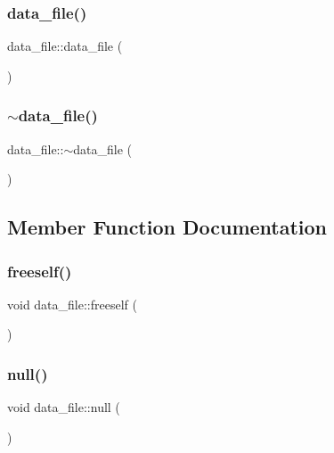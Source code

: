 \subsubsection{\texorpdfstring{data\+\_\+file()}{data\_file()}}
{\footnotesize\ttfamily data\+\_\+file\+::data\+\_\+file (\begin{DoxyParamCaption}{ }\end{DoxyParamCaption})}

\mbox{\label{classdata__file_aa22160224049787c9f96f56fbbbbe010}} 
\subsubsection{\texorpdfstring{$\sim$data\+\_\+file()}{~data\_file()}}
{\footnotesize\ttfamily data\+\_\+file\+::$\sim$data\+\_\+file (\begin{DoxyParamCaption}{ }\end{DoxyParamCaption})}



\subsection{Member Function Documentation}
\mbox{\label{classdata__file_a01eb99b854156722d99419f407f1374d}} 
\subsubsection{\texorpdfstring{freeself()}{freeself()}}
{\footnotesize\ttfamily void data\+\_\+file\+::freeself (\begin{DoxyParamCaption}{ }\end{DoxyParamCaption})}

\mbox{\label{classdata__file_a79d79d896f0392c516daf9d409f4aae9}} 
\subsubsection{\texorpdfstring{null()}{null()}}
{\footnotesize\ttfamily void data\+\_\+file\+::null (\begin{DoxyParamCaption}{ }\end{DoxyParamCaption})}


